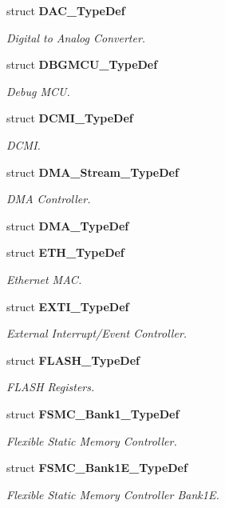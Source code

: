\begin{DoxyCompactItemize}
struct \textbf{ D\+A\+C\+\_\+\+Type\+Def}
\begin{DoxyCompactList}\small\item\em Digital to Analog Converter. \end{DoxyCompactList}\item 
struct \textbf{ D\+B\+G\+M\+C\+U\+\_\+\+Type\+Def}
\begin{DoxyCompactList}\small\item\em Debug M\+CU. \end{DoxyCompactList}\item 
struct \textbf{ D\+C\+M\+I\+\_\+\+Type\+Def}
\begin{DoxyCompactList}\small\item\em D\+C\+MI. \end{DoxyCompactList}\item 
struct \textbf{ D\+M\+A\+\_\+\+Stream\+\_\+\+Type\+Def}
\begin{DoxyCompactList}\small\item\em D\+MA Controller. \end{DoxyCompactList}\item 
struct \textbf{ D\+M\+A\+\_\+\+Type\+Def}
\item 
struct \textbf{ E\+T\+H\+\_\+\+Type\+Def}
\begin{DoxyCompactList}\small\item\em Ethernet M\+AC. \end{DoxyCompactList}\item 
struct \textbf{ E\+X\+T\+I\+\_\+\+Type\+Def}
\begin{DoxyCompactList}\small\item\em External Interrupt/\+Event Controller. \end{DoxyCompactList}\item 
struct \textbf{ F\+L\+A\+S\+H\+\_\+\+Type\+Def}
\begin{DoxyCompactList}\small\item\em F\+L\+A\+SH Registers. \end{DoxyCompactList}\item 
struct \textbf{ F\+S\+M\+C\+\_\+\+Bank1\+\_\+\+Type\+Def}
\begin{DoxyCompactList}\small\item\em Flexible Static Memory Controller. \end{DoxyCompactList}\item 
struct \textbf{ F\+S\+M\+C\+\_\+\+Bank1\+E\+\_\+\+Type\+Def}
\begin{DoxyCompactList}\small\item\em Flexible Static Memory Controller Bank1E. \end{DoxyCompactList}\item 

\end{DoxyCompactItemize}
